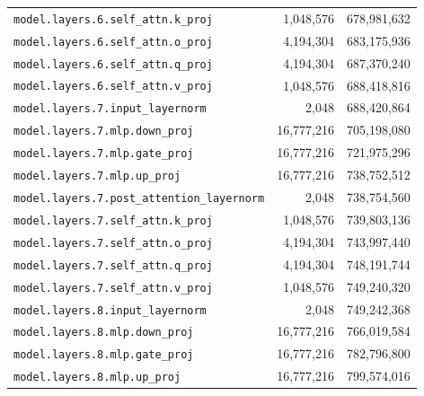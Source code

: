 \documentclass[10pt,a4paper]{article}
\theoremstyle{definition}
\begin{document}
\begin{appendices}
\begin{longtable}{p{9.5cm}rr}
\texttt{model.\allowbreak{}layers.\allowbreak{}6.\allowbreak{}self\_attn.\allowbreak{}k\_proj} & 1,048,576 & 678,981,632 \\
\texttt{model.\allowbreak{}layers.\allowbreak{}6.\allowbreak{}self\_attn.\allowbreak{}o\_proj} & 4,194,304 & 683,175,936 \\
\texttt{model.\allowbreak{}layers.\allowbreak{}6.\allowbreak{}self\_attn.\allowbreak{}q\_proj} & 4,194,304 & 687,370,240 \\
\texttt{model.\allowbreak{}layers.\allowbreak{}6.\allowbreak{}self\_attn.\allowbreak{}v\_proj} & 1,048,576 & 688,418,816 \\
\texttt{model.\allowbreak{}layers.\allowbreak{}7.\allowbreak{}input\_layernorm} & 2,048 & 688,420,864 \\
\texttt{model.\allowbreak{}layers.\allowbreak{}7.\allowbreak{}mlp.\allowbreak{}down\_proj} & 16,777,216 & 705,198,080 \\
\texttt{model.\allowbreak{}layers.\allowbreak{}7.\allowbreak{}mlp.\allowbreak{}gate\_proj} & 16,777,216 & 721,975,296 \\
\texttt{model.\allowbreak{}layers.\allowbreak{}7.\allowbreak{}mlp.\allowbreak{}up\_proj} & 16,777,216 & 738,752,512 \\
\texttt{model.\allowbreak{}layers.\allowbreak{}7.\allowbreak{}post\_attention\_layernorm} & 2,048 & 738,754,560 \\
\texttt{model.\allowbreak{}layers.\allowbreak{}7.\allowbreak{}self\_attn.\allowbreak{}k\_proj} & 1,048,576 & 739,803,136 \\
\texttt{model.\allowbreak{}layers.\allowbreak{}7.\allowbreak{}self\_attn.\allowbreak{}o\_proj} & 4,194,304 & 743,997,440 \\
\texttt{model.\allowbreak{}layers.\allowbreak{}7.\allowbreak{}self\_attn.\allowbreak{}q\_proj} & 4,194,304 & 748,191,744 \\
\texttt{model.\allowbreak{}layers.\allowbreak{}7.\allowbreak{}self\_attn.\allowbreak{}v\_proj} & 1,048,576 & 749,240,320 \\
\texttt{model.\allowbreak{}layers.\allowbreak{}8.\allowbreak{}input\_layernorm} & 2,048 & 749,242,368 \\
\texttt{model.\allowbreak{}layers.\allowbreak{}8.\allowbreak{}mlp.\allowbreak{}down\_proj} & 16,777,216 & 766,019,584 \\
\texttt{model.\allowbreak{}layers.\allowbreak{}8.\allowbreak{}mlp.\allowbreak{}gate\_proj} & 16,777,216 & 782,796,800 \\
\texttt{model.\allowbreak{}layers.\allowbreak{}8.\allowbreak{}mlp.\allowbreak{}up\_proj} & 16,777,216 & 799,574,016 \\

\end{longtable}
\end{appendices}
\end{document}
